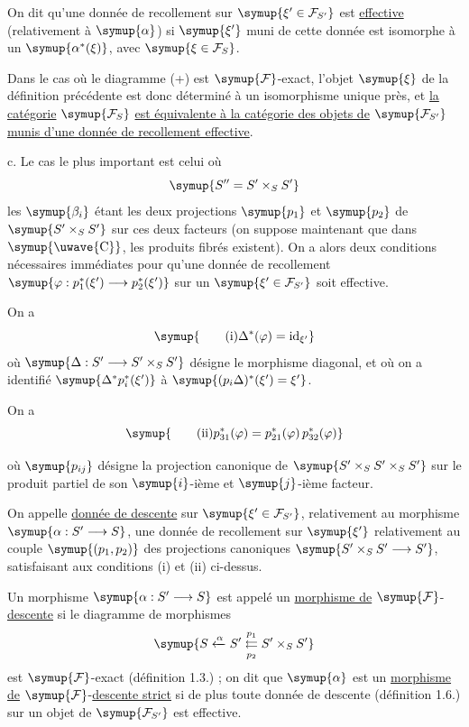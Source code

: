 On dit qu'une donnée de recollement sur
$\symup{\xi'\in\mathcal F_{S'}}$ est \uline{effective} (relativement à $\symup{\alpha}$) si
$\symup{\xi'}$ muni de cette donnée est isomorphe à un $\symup{\alpha^*(\xi)}$, avec
$\symup{\xi\in\mathcal F_S}$.

Dans le cas où le diagramme (+) est $\symup{\mathcal F}$-exact, l'objet $\symup{\xi}$ de la
définition précédente est donc déterminé à un isomorphisme unique près, et \uline{la catégorie} $\symup{\mathcal F_S}$ \uline{est équivalente à la catégorie des objets de}
$\symup{\mathcal F_{S'}}$ \uline{munis d'une donnée de recollement effective}.

\medskip\noindent
c. Le cas le plus important est celui où
\[
  \symup{S''=S'\times_S S'}
\]
les $\symup{\beta_i}$ étant les deux projections $\symup{p_1}$ et $\symup{p_2}$ de
$\symup{S'\times_S S'}$ sur ces deux facteurs (on suppose maintenant que dans
$\symup{\text{\uwave{C}}}$, les produits fibrés existent). On a alors deux conditions
nécessaires immédiates pour qu'une donnée de recollement
$\symup{\varphi:p_1^*(\xi')\longrightarrow p_2^*(\xi')}$ sur un
$\symup{\xi'\in\mathcal F_{S'}}$ soit effective.

On a
\[
  \symup{\tag{i}
  \Delta^*(\varphi)=\operatorname{id}_{\xi'}}
\]
où $\symup{\Delta:S'\longrightarrow S'\times_S S'}$ désigne le morphisme diagonal, et
où on a identifié $\symup{\Delta^*p_i^*(\xi')}$ à
$\symup{(p_i\Delta)^*(\xi')=\xi'}$.

On a
\[
  \symup{\tag{ii}
  p_{31}^*(\varphi)=p_{21}^*(\varphi)\,p_{32}^*(\varphi)}
\]

où $\symup{p_{ij}}$ désigne la projection canonique de
$\symup{S'\times_S S'\times_S S'}$ sur le produit partiel de son $\symup{i}$-ième et
$\symup{j}$-ième facteur.

 On appelle \uline{donnée de descente} sur
$\symup{\xi'\in\mathcal F_{S'}}$, relativement au morphisme
$\symup{\alpha:S'\longrightarrow S}$, une donnée de recollement sur $\symup{\xi'}$
relativement au couple $\symup{(p_1,p_2)}$ des projections canoniques
$\symup{S'\times_S S'\longrightarrow S'}$, satisfaisant aux conditions (i) et (ii)
ci-dessus.

 Un morphisme $\symup{\alpha:S'\longrightarrow S}$ est appelé
un \uline{morphisme de} $\symup{\mathcal F}$-\uline{descente} si le diagramme de morphismes
\[
  \symup{S\xleftarrow{\alpha}S'
  \overset{p_1}{\underset{p_2}{\leftleftarrows}}S'\times_S S'}
\]
est $\symup{\mathcal F}$-exact (définition 1.3.) ; on dit que $\symup{\alpha}$ est un
\uline{morphisme de} $\symup{\mathcal F}$-\uline{descente strict} si de plus toute donnée de
descente (définition 1.6.) sur un objet de $\symup{\mathcal F_{S'}}$ est effective.

